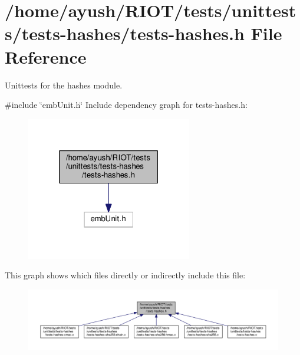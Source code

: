 \hypertarget{tests-hashes_8h}{}\section{/home/ayush/\+R\+I\+O\+T/tests/unittests/tests-\/hashes/tests-\/hashes.h File Reference}
\label{tests-hashes_8h}


Unittests for the {\ttfamily hashes} module.  


{\ttfamily \#include \char`\"{}emb\+Unit.\+h\char`\"{}}\newline
Include dependency graph for tests-\/hashes.h\+:
\nopagebreak
\begin{figure}[H]
\begin{center}
\leavevmode
\includegraphics[width=205pt]{tests-hashes_8h__incl}
\end{center}
\end{figure}
This graph shows which files directly or indirectly include this file\+:
\nopagebreak
\begin{figure}[H]
\begin{center}
\leavevmode
\includegraphics[width=350pt]{tests-hashes_8h__dep__incl}
\end{center}
\end{figure}
